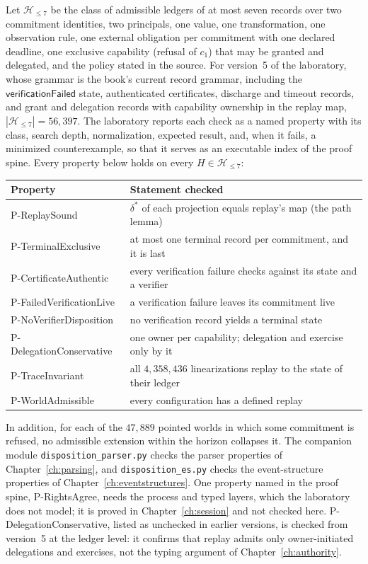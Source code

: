 \documentclass[11pt,openany]{book}
\theoremstyle{remark}
\begin{document}
Let $\mathcal H_{\le 7}$ be the class of admissible ledgers of at most
seven records over two commitment identities, two principals, one value,
one transformation, one observation rule, one external obligation per
commitment with one declared deadline, one exclusive capability (refusal
of $c_1$) that may be granted and delegated, and the policy stated in the
source. For version~5 of the laboratory, whose grammar is the book's
current record grammar, including the $\mathsf{verificationFailed}$ state,
authenticated certificates, discharge and timeout records, and grant and
delegation records with capability ownership in the replay map,
$|\mathcal H_{\le 7}|=56{,}397$. The laboratory reports each check as a
named property with its class, search depth, normalization, expected
result, and, when it fails, a minimized counterexample, so that it serves
as an executable index of the proof spine. Every property below holds on
every $H\in\mathcal H_{\le 7}$:
\begin{center}
\small
\begin{tabular}{ll}
\toprule
Property & Statement checked\\
\midrule
P-ReplaySound & $\delta^{*}$ of each projection equals replay's map (the path lemma)\\
P-TerminalExclusive & at most one terminal record per commitment, and it is last\\
P-CertificateAuthentic & every verification failure checks against its state and a verifier\\
P-FailedVerificationLive & a verification failure leaves its commitment live\\
P-NoVerifierDisposition & no verification record yields a terminal state\\
P-DelegationConservative & one owner per capability; delegation and exercise only by it\\
P-TraceInvariant & all $4{,}358{,}436$ linearizations replay to the state of their ledger\\
P-WorldAdmissible & every configuration has a defined replay\\
\bottomrule
\end{tabular}
\end{center}
In addition, for each of the $47{,}889$ pointed worlds in which some
commitment is refused, no admissible extension within the horizon
collapses it. The companion module \texttt{disposition\allowbreak\_parser.py}
checks the parser properties of Chapter~\ref{ch:parsing}, and
\texttt{disposition\allowbreak\_es.py} checks the event-structure
properties of Chapter~\ref{ch:eventstructures}. One property named in the
proof spine, P-RightsAgree, needs the process and typed layers, which the
laboratory does not model; it is proved in Chapter~\ref{ch:session} and
not checked here. P-DelegationConservative, listed as unchecked in
earlier versions, is checked from version~5 at the ledger level: it
confirms that replay admits only owner-initiated delegations and
exercises, not the typing argument of Chapter~\ref{ch:authority}.
\end{document}
